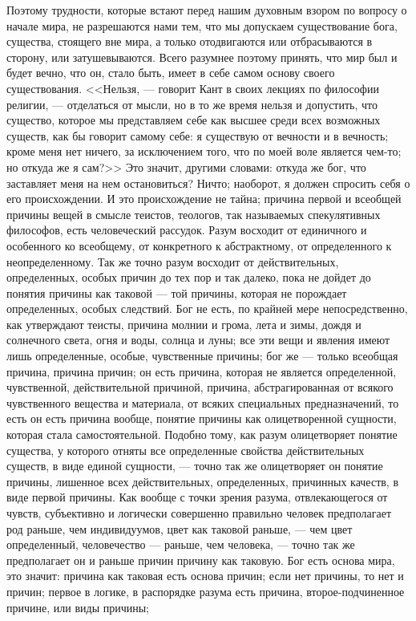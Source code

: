 \documentclass[12pt]{article}
\begin{document}
Поэтому трудности, которые встают перед нашим духовным взором по вопросу о начале мира, не разрешаются нами тем, что мы допускаем существование бога, существа, стоящего вне мира, а только отодвигаются или отбрасываются в сторону, или затушевываются. Всего разумнее поэтому принять, что мир был и будет вечно, что он, стало быть, имеет в себе самом основу своего существования. <<Нельзя, --- говорит Кант в своих лекциях по философии религии, --- отделаться от мысли, но в то же время нельзя и допустить, что существо, которое мы представляем себе как высшее среди всех возможных существ, как бы говорит самому себе: я существую от вечности и в вечность; кроме меня нет ничего, за исключением того, что по моей воле является чем-то; но откуда же я сам?>> Это значит, другими словами: откуда же бог, что заставляет меня на нем остановиться? Ничто; наоборот, я должен спросить себя о его происхождении. И это происхождение не тайна; причина первой и всеобщей причины вещей в смысле теистов, теологов, так называемых спекулятивных философов, есть человеческий рассудок. Разум восходит от единичного и особенного ко всеобщему, от конкретного к абстрактному, от определенного к неопределенному. Так же точно разум восходит от действительных, определенных, особых причин до тех пор и так далеко, пока не дойдет до понятия причины как таковой --- той причины, которая не порождает определенных, особых следствий. Бог не есть, по крайней мере непосредственно, как утверждают теисты, причина молнии и грома, лета и зимы, дождя и солнечного света, огня и воды, солнца и луны; все эти вещи и явления имеют лишь определенные, особые, чувственные причины; бог же --- только всеобщая причина, причина причин; он есть причина, которая не является определенной, чувственной, действительной причиной, причина, абстрагированная от всякого чувственного вещества и материала, от всяких специальных предназначений, то есть он есть причина вообще, понятие причины как олицетворенной сущности, которая стала самостоятельной. Подобно тому, как разум олицетворяет понятие существа, у которого отняты все определенные свойства действительных существ, в виде единой сущности, --- точно так же олицетворяет он понятие причины, лишенное всех действительных, определенных, причинных качеств, в виде первой причины. Как вообще с точки зрения разума, отвлекающегося от чувств, субъективно и логически совершенно правильно человек предполагает род раньше, чем индивидуумов, цвет как таковой раньше, --- чем цвет определенный, человечество --- раньше, чем человека, --- точно так же предполагает он и раньше причин причину как таковую. Бог есть основа мира, это значит: причина как таковая есть основа причин; если нет причины, то нет и причин; первое в логике, в распорядке разума есть причина, второе-подчиненное причине, или виды причины; 
\end{document}
